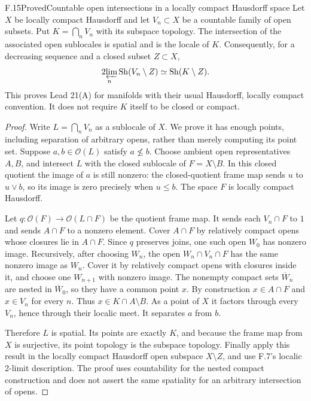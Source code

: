 \begin{statement}{F.15}{Proved}{Countable open intersections in a locally compact Hausdorff space}
Let $X$ be locally compact Hausdorff and let $V_n\subset X$ be a
countable family of open subsets. Put $K=\bigcap_nV_n$ with its
subspace topology. The intersection of the associated open sublocales
is spatial and is the locale of $K$. Consequently, for a decreasing
sequence and a closed subset $Z\subset X$,
\[
 \operatorname*{2\!\varprojlim}_n\operatorname{Sh}(V_n\setminus Z)
       \simeq\operatorname{Sh}(K\setminus Z).
\]
This proves Lead 21(A) for manifolds with their usual Hausdorff,
locally compact convention. It does not require $K$ itself to be
closed or compact.
\end{statement}
\begin{proof}
Write $L=\bigcap_n V_n$ as a sublocale of $X$. We prove it has
enough points, including separation of arbitrary opens, rather than
merely computing its point set. Suppose $a,b\in\mathcal O(L)$
satisfy $a\not\leq b$. Choose ambient open representatives $A,B$,
and intersect $L$ with the closed sublocale of $F=X\setminus B$.
In this closed quotient the image of $a$ is still nonzero: the
closed-quotient frame map sends $u$ to $u\vee b$, so its image is
zero precisely when $u\leq b$. The space $F$ is locally compact
Hausdorff.

Let $q:\mathcal O(F)\to\mathcal O(L\cap F)$ be the quotient
frame map. It sends each $V_n\cap F$ to $1$ and sends $A\cap F$
to a nonzero element. Cover $A\cap F$ by relatively compact opens
whose closures lie in $A\cap F$. Since $q$ preserves joins, one
such open $W_0$ has nonzero image. Recursively, after choosing $W_n$,
the open $W_n\cap V_n\cap F$ has the same nonzero image as $W_n$.
Cover it by relatively compact opens with closures inside it, and
choose one $W_{n+1}$ with nonzero image. The nonempty compact sets
$\overline W_n$ are nested in $\overline W_0$, so they have a
common point $x$. By construction $x\in A\cap F$ and
$x\in V_n$ for every $n$. Thus $x\in K\cap A\setminus B$.
As a point of $X$ it factors through every $V_n$, hence through
their localic meet. It separates $a$ from $b$.

Therefore $L$ is spatial. Its points are exactly $K$, and because
the frame map from $X$ is surjective, its point topology is the
subspace topology. Finally apply this result in the locally compact
Hausdorff open subspace $X\setminus Z$, and use F.7's localic
2-limit description. The proof uses countability for the nested
compact construction and does not assert the same spatiality for an
arbitrary intersection of opens.
\end{proof}

